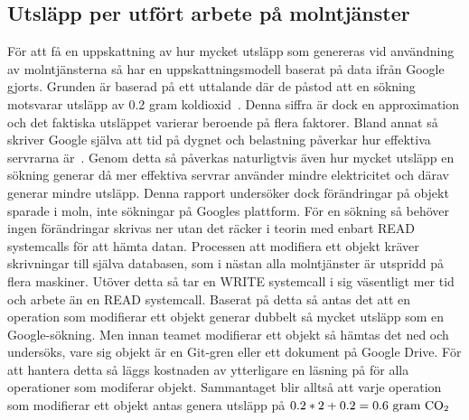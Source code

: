 \subsection{Utsläpp per utfört arbete på molntjänster}
\label{joel_a-method-cloud-eq}
För att få en uppskattning av hur mycket utsläpp som genereras vid användning av molntjänsterna så har en uppskattningsmodell baserat på data ifrån Google gjorts. Grunden är baserad på ett  uttalande där de påstod att en sökning motsvarar utsläpp av 0.2 gram koldioxid~\cite{google-blog}. Denna siffra är dock en approximation och det faktiska utsläppet varierar beroende på flera faktorer. Bland annat så skriver Google själva att tid på dygnet och belastning påverkar hur effektiva servrarna är~\cite{google-warehouse}. Genom detta så påverkas naturligtvis även hur mycket utsläpp en sökning generar då mer effektiva servrar använder mindre elektricitet och därav generar mindre utsläpp. Denna rapport undersöker dock förändringar på objekt sparade i moln, inte sökningar på Googles plattform. För en sökning så behöver ingen förändringar skrivas ner utan det räcker i teorin med enbart READ systemcalls för att hämta datan. Processen att modifiera ett objekt kräver skrivningar till själva databasen, som i nästan alla molntjänster är utspridd på flera maskiner. Utöver detta så tar en WRITE systemcall i sig väsentligt mer tid och arbete än en READ systemcall. Baserat på detta så antas det att en operation som modifierar ett objekt generar dubbelt så mycket utsläpp som en Google-sökning. Men innan teamet modifierar ett objekt så hämtas det ned och undersöks, vare sig objekt är en Git-gren eller ett dokument på Google Drive. För att hantera detta så läggs kostnaden av ytterligare en läsning på för alla operationer som modiferar objekt. Sammantaget blir alltså att varje operation som modifierar ett objekt antas genera utsläpp på $0.2 * 2 + 0.2 = 0.6 \text{ gram \ce{CO2} }$

